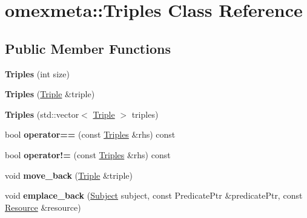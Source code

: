 \hypertarget{classomexmeta_1_1Triples}{}\section{omexmeta\+:\+:Triples Class Reference}
\label{classomexmeta_1_1Triples}
\subsection*{Public Member Functions}
\begin{DoxyCompactItemize}
\item 
\mbox{\label{classomexmeta_1_1Triples_a32ea34c1fd3bfe9887c2221377392efe}} 
{\bfseries Triples} (int size)
\item 
\mbox{\label{classomexmeta_1_1Triples_a733eea0f6a2c206eb96771bc7a8cb430}} 
{\bfseries Triples} (\hyperlink{classomexmeta_1_1Triple}{Triple} \&triple)
\item 
\mbox{\label{classomexmeta_1_1Triples_a71a3ff7b185a5420eabd9bf4e9637196}} 
{\bfseries Triples} (std\+::vector$<$ \hyperlink{classomexmeta_1_1Triple}{Triple} $>$ triples)
\item 
\mbox{\label{classomexmeta_1_1Triples_a8c6e00fe9e694d9c52e1fa37a82ae489}} 
bool {\bfseries operator==} (const \hyperlink{classomexmeta_1_1Triples}{Triples} \&rhs) const
\item 
\mbox{\label{classomexmeta_1_1Triples_a8c9df0d37572179d682127cb7368dd82}} 
bool {\bfseries operator!=} (const \hyperlink{classomexmeta_1_1Triples}{Triples} \&rhs) const
\item 
\mbox{\label{classomexmeta_1_1Triples_a88dcf4b950f105acb621bd07f07a38a0}} 
void {\bfseries move\+\_\+back} (\hyperlink{classomexmeta_1_1Triple}{Triple} \&triple)
\item 
\mbox{\label{classomexmeta_1_1Triples_a9882f6f582e8d2e34e09d2f7076a0e2e}} 
void {\bfseries emplace\+\_\+back} (\hyperlink{classomexmeta_1_1Subject}{Subject} subject, const Predicate\+Ptr \&predicate\+Ptr, const \hyperlink{classomexmeta_1_1Resource}{Resource} \&resource)

\end{DoxyCompactItemize}

